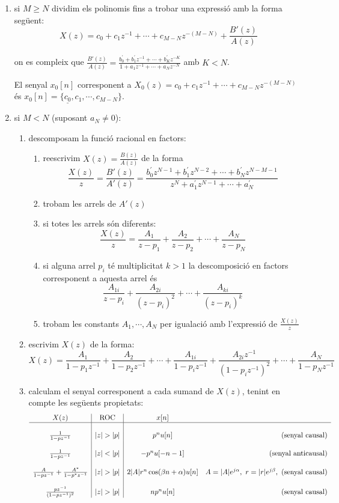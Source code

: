 \documentclass{article}
\begin{document}
\begin{enumerate}
\item si $M \geq N$ dividim els polinomis fins a trobar una expressi\'o amb la forma seg\"uent:
\[
X(z)=c_0+c_1z^{-1}+\cdots+c_{M-N} z^{-(M-N)}+\frac{B'(z)}{A(z)}
\]

on es compleix que $\frac{B'(z)}{A(z)}=\frac{b^{'}_0+b^{'}_1z^{-1}+\cdots+b^{'}_Kz^{-K}}{1+a_1z^{-1}+\cdots+a_Nz^{-N}}$
amb $K < N$.

El senyal $x_0[n]$ corresponent a $X_0(z)= c_0+c_1z^{-1}+\cdots+c_{M-N} z^{-(M-N)}$ \'es 
$x_0[n]=\{\underline{c_0}, c_1, \cdots, c_{M-N}\}$.

\item si $M < N$ (suposant $a_N \neq 0$):
\begin{enumerate}
\item descomposam la funci\'o racional en factors:
\begin{enumerate}
\item reescrivim $X(z)=\frac{B(z)}{A(z)}$ de la forma 
\[
\frac{X(z)}{z}=\frac{B'(z)}{A'(z)}=\frac{b^{'}_0 z^{N-1} + b^{'}_1 z^{N-2} + \cdots + b^{'}_N z^{N-M-1}}{z^N+a^{'}_1 z^{N-1} + \cdots + a^{'}_N}
\]
\item trobam les arrels de $A'(z)$
\item si totes les arrels s\'on diferents: 
\[
\frac{X(z)}{z}= \frac{A_1}{z-p_1} + \frac{A_2}{z-p_2} + \cdots + \frac{A_N}{z-p_N}
\]
\item si alguna arrel $p_i$ t\'e multiplicitat $k > 1$ la descomposici\'o en factors corresponent a
aquesta arrel \'es
\[
\frac{A_{1i}}{z-p_i} + \frac{A_{2i}}{(z-p_i)^2} + \cdots + \frac{A_{ki}}{(z-p_i)^k}
\]
\item trobam les constants $A_1, \cdots, A_N$ per igualaci\'o amb l'expressi\'o de $\frac{X(z)}{z}$
\end{enumerate}
\item escrivim $X(z)$ de la forma:
\[
X(z)= \frac{A_1}{1-p_1z^{-1}} + \frac{A_2}{1-p_2z^{-1}} + \cdots + \frac{A_{1i}}{1-p_i z^{-1}} + \frac{A_{2i} z^{-1}}{(1-p_i z^{-1})^2} + 
\cdots + \frac{A_N}{1-p_Nz^{-1}}
\]
\item calculam el senyal corresponent a cada sumand de $X(z)$, tenint en compte les seg\"uents propietats:
\[
\begin{array}{c|c|cr}
X(z) & \text{ROC} & x[n] & \\ \hline & & & \\
\frac{1}{1-pz^{-1}} & |z|>|p| & p^n u[n] & \text{(senyal causal)} \\ & & & \\
\frac{1}{1-pz^{-1}} & |z|<|p| & -p^n u[-n-1] & \text{(senyal anticausal)} \\ & & & \\
\frac{A}{1-pz^{-1}}  + \frac{A^*}{1-p^*z^{-1}} & |z|>|p| & 2 |A| r^n \cos(\beta n + \alpha) u[n] & 
A=|A|e^{j\alpha}, \,\, r=|r|e^{j\beta}, \,\, \text{(senyal causal)} \\ & & & \\
\frac{pz^{-1}}{(1-pz^{-1})^2} & |z|>|p| & np^nu[n] & \text{(senyal causal)}
\end{array}
\]


\end{enumerate}
\end{enumerate}
\end{document}
